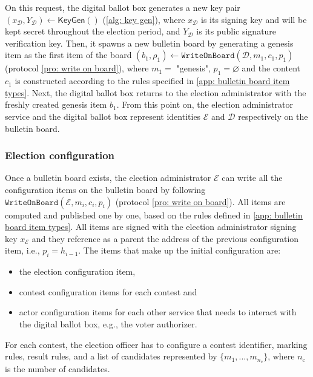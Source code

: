 On this request, the digital ballot box generates a new key pair $(x_\mathcal{D}, Y_\mathcal{D}) \gets \mathsf{KeyGen}()$ (\cref{alg: key gen}), where $x_\mathcal{D}$ is its signing key and will be kept secret throughout the election period, and $Y_\mathcal{D}$ is its public signature verification key. Then, it spawns a new bulletin board by generating a genesis item as the first item of the board $(b_1, \rho_1) \gets \mathtt{WriteOnBoard}(\mathcal{D}, m_1, c_1, p_1)$ (protocol \ref{pro: write on board}), where $m_1 = $ "genesis", $p_1 = \varnothing$ and the content $c_1$ is constructed according to the rules specified in \cref{app: bulletin board item types}. Next, the digital ballot box returns to the election administrator with the freshly created genesis item $b_1$. From this point on, the election administrator service and the digital ballot box represent identities $\mathcal{E}$ and $\mathcal{D}$ respectively on the bulletin board.


\subsubsection{Election configuration} \label{sec: election configuration}
Once a bulletin board exists, the election administrator $\mathcal{E}$ can write all the configuration items on the bulletin board by following $\mathtt{WriteOnBoard}(\mathcal{E}, m_i, c_i, p_i)$ (protocol \ref{pro: write on board}). All items are computed and published one by one, based on the rules defined in \cref{app: bulletin board item types}. All items are signed with the election administrator signing key $x_\mathcal{E}$ and they reference as a parent the address of the previous configuration item, i.e., $p_i = h_{i-1}$. The items that make up the initial configuration are:
\begin{itemize}
    \item the election configuration item,
    \item contest configuration items for each contest and
    \item actor configuration items for each other service that needs to interact with the digital ballot box, e.g., the voter authorizer.
\end{itemize}

For each contest, the election officer has to configure a contest identifier, marking rules, result rules, and a list of candidates represented by $\{ m_1, ..., m_{n_\mathrm{c}} \}$, where $n_\mathrm{c}$ is the number of candidates.

